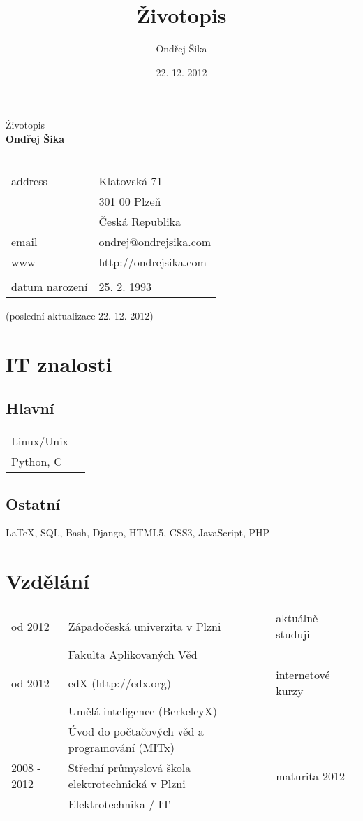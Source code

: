 \documentclass[12pt,a4paper]{article}
\title{Životopis}
\author{Ondřej Šika}
\date{22. 12. 2012}
\begin{document}
\begin{center}
{\Large Životopis}\\
\vspace*{1cm}
{\LARGE \bf Ondřej Šika}\\
\hrulefill\\
\vspace*{0.2cm}
\begin{tabular}{l l}
address & Klatovská 71\\
 & 301 00 Plzeň\\
 & Česká Republika\\
email & ondrej@ondrejsika.com\\
www & http://ondrejsika.com\\
\\
datum narození & 25. 2. 1993\\
\end{tabular}

\vspace*{0.2cm}
{\small (poslední aktualizace 22. 12. 2012)}
\end{center}

\section*{IT znalosti}
\subsection*{Hlavní}
\begin{tabular}{@{}ll}
Linux/Unix & \\
Python, C & \\
\end{tabular}

\subsection*{Ostatní}
LaTeX, SQL, Bash, Django, HTML5, CSS3, JavaScript, PHP

\section*{Vzdělání}
\begin{tabular}{@{}p{2cm}ll}
od 2012  & Západočeská univerzita v Plzni & aktuálně studuji\\
 & Fakulta Aplikovaných Věd & \\
od 2012  & edX (http://edx.org) & internetové kurzy\\
 & Umělá inteligence (BerkeleyX) & \\
 & Úvod do počtačových věd a programování (MITx) & \\
2008 - 2012 & Střední průmyslová škola elektrotechnická v Plzni & maturita 2012\\
 & Elektrotechnika / IT & \\
\end{tabular}
\end{document}
